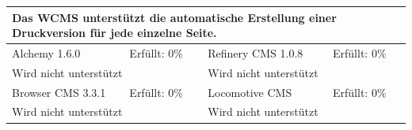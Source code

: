 \newline
\newline
\newline

\begin{tabular}[!ht]{|l|l|l|l|}
\hline
\multicolumn{4}{|p{15cm}|}{\textbf{Das WCMS unterstützt die automatische Erstellung einer Druckversion für jede einzelne Seite.}} \\
\hline
  Alchemy 1.6.0 & \cellcolor{red}Erfüllt: 0\% & Refinery CMS 1.0.8 & \cellcolor{red}Erfüllt: 0\% \\
  \hline
  \multicolumn{2}{|p{7.5cm}|}{Wird nicht unterstützt} & \multicolumn{2}{p{7.5cm}|}{Wird nicht unterstützt} \\
  \hline
  Browser CMS 3.3.1 & \cellcolor{red}Erfüllt: 0\% & Locomotive CMS & \cellcolor{red}Erfüllt: 0\% \\
  \hline
  \multicolumn{2}{|p{7.5cm}|}{Wird nicht unterstützt} & \multicolumn{2}{p{7.5cm}|}{Wird nicht unterstützt} \\
\hline
\end{tabular}
